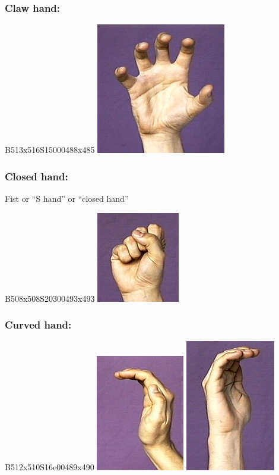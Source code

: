 \documentclass{article}
\begin{document}
\subsubsection{Claw hand:}

B513x516S15000488x485
\includegraphics[scale=0.5]{images/claw.jpg}

\subsubsection{Closed hand:}

Fist or ``S hand'' or ``closed hand''

B508x508S20300493x493
\includegraphics[scale=0.5]{images/s.jpg}

\subsubsection{Curved hand:}

B512x510S16e00489x490
\includegraphics[scale=0.5]{images/curvedhandshape.jpg}
\includegraphics[scale=0.5]{images/curvedhandshape2.jpg}
\end{document}

